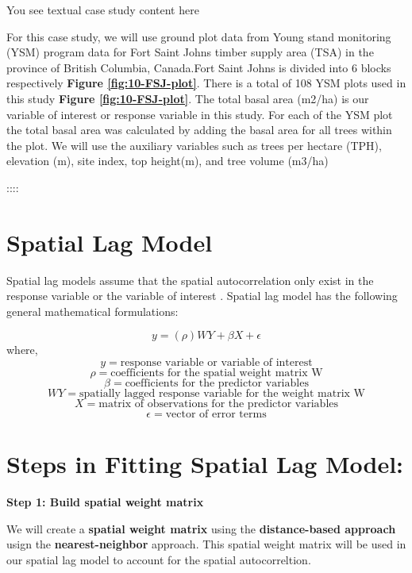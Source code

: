 \documentclass[
]{book}
\begin{document}
You see textual case study content here

For this case study, we will use ground plot data from Young stand monitoring (YSM) program data \citep{province_of_bc_provincial_2018} for Fort Saint Johns timber supply area (TSA) in the province of British Columbia, Canada.Fort Saint Johns is divided into 6 blocks respectively \textbf{Figure \ref{fig:10-FSJ-plot}}. There is a total of 108 YSM plots used in this study \textbf{Figure \ref{fig:10-FSJ-plot}}. The total basal area (m2/ha) is our variable of interest or response variable in this study. For each of the YSM plot the total basal area was calculated by adding the basal area for all trees within the plot. We will use the auxiliary variables such as trees per hectare (TPH), elevation (m), site index, top height(m), and tree volume (m3/ha)

::::

\hypertarget{spatial-lag-model}{%
\section{Spatial Lag Model}\label{spatial-lag-model}}

Spatial lag models assume that the spatial autocorrelation only exist in the response variable or the variable of interest \citep{anselin_spatial_1998}. Spatial lag model has the following general mathematical formulations:

\[ y=  (\rho)WY + \beta X + \epsilon\]
where, \[y= \text{response variable or variable of interest}\]
\[\rho= \text{coefficients for the spatial weight matrix W}\]
\[\beta= \text{coefficients for the predictor variables}\]
\[WY=\text{spatially lagged response variable for the weight matrix W}\]
\[X=\text{matrix of observations for the predictor variables}\]
\[\epsilon=\text{vector of error terms}\]

\hypertarget{steps-in-fitting-spatial-lag-model}{%
\section{Steps in Fitting Spatial Lag Model:}\label{steps-in-fitting-spatial-lag-model}}

\textbf{Step 1: Build spatial weight matrix}

We will create a \textbf{spatial weight matrix} using the \textbf{distance-based approach} usign the \textbf{nearest-neighbor} approach. This spatial weight matrix will be used in our spatial lag model to account for the spatial autocorreltion.
\end{document}
